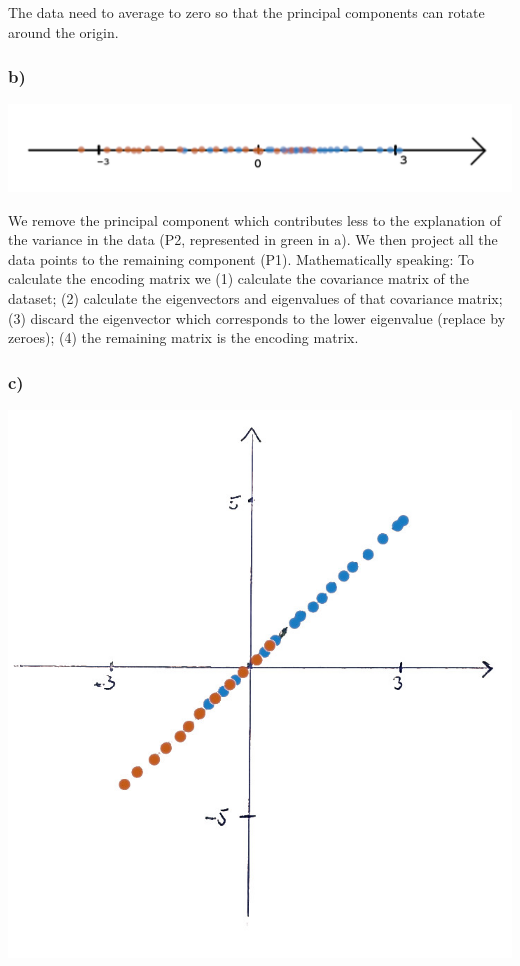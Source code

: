 \documentclass{article}
\begin{document}
The data need to average to zero so that the principal components can rotate around the origin.

\subsubsection*{b)}

\begin{center}
    \includegraphics[width=0.85\linewidth]{img/fig3_new.png}
\end{center}


We remove the principal component which contributes less to the explanation of the variance in the data (P2, represented in green in a). We then project all the data points to the remaining component (P1). Mathematically speaking: To calculate the encoding matrix we (1) calculate the covariance matrix of the dataset; (2) calculate the eigenvectors and eigenvalues of that covariance matrix; (3) discard the eigenvector which corresponds to the lower eigenvalue (replace by zeroes); (4) the remaining matrix is the encoding matrix.

\subsubsection*{c)}

\begin{center}
    \includegraphics[width=0.75\linewidth]{img/fig3_decoded_new.jpg}
\end{center}
\end{document}
